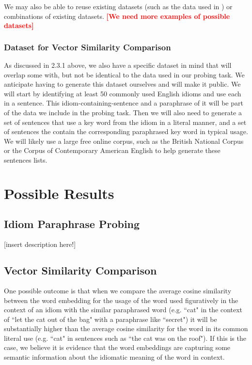 \documentclass[11pt,a4paper]{article}
\newcommand{\comment}[1]{\textcolor{red}{\bf \small [#1]}}
\begin{document}
We may also be able to reuse existing datasets (such as the data used in \cite{bizzoni-lappin-2018-predicting}) or combinations of existing datasets. \comment{We need more examples of possible datasets}

\vspace{15mm}


\subsubsection{Dataset for Vector Similarity Comparison}
As discussed in 2.3.1 above, we also have a specific dataset in mind that will overlap some with, but not be identical to the data used in our probing task. We anticipate having to generate this dataset ourselves and will make it public. We will start by identifying at least 50 commonly used English idioms and use each in a sentence. This idiom-containing-sentence and a paraphrase of it will be part of the data we include in the probing task. Then we will also need to generate a set of sentences that use a key word from the idiom in a literal manner, and a set of sentences the contain the corresponding paraphrased key word in typical usage. We will likely use a large free online corpus, such as the British National Corpus or the Corpus of Contemporary American English to help generate these sentences lists.






\section{Possible Results}

\subsection{Idiom Paraphrase Probing}
[insert description here!]

\subsection{Vector Similarity Comparison}
One possible outcome is that when we compare the average cosine similarity between the word embedding for the usage of the word used figuratively in the context of an idiom with the similar paraphrased word (e.g. ``cat" in the context of ``let the cat out of the bag" with a paraphrase like ``secret")  it will be substantially higher than the average cosine similarity for the word in its common literal use (e.g. ``cat" in sentences such as ``the cat was on the roof"). If this is the case, we believe it is evidence that the word embeddings are capturing some semantic information about the idiomatic meaning of the word in context. 
\end{document}
